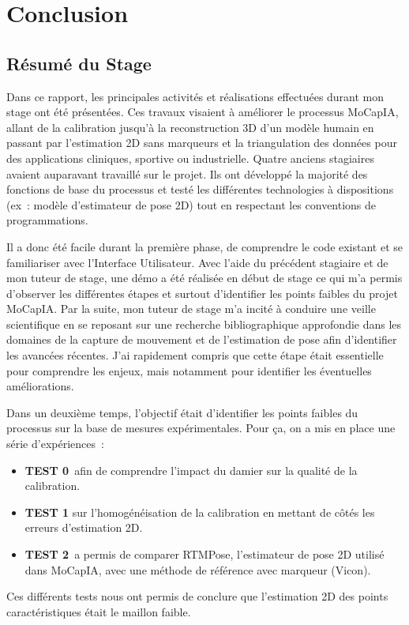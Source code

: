 \chapter{Conclusion}

\section{Résumé du Stage}
    
    Dans ce rapport, les principales activités et réalisations effectuées durant mon stage ont été présentées. Ces travaux visaient à améliorer le processus MoCapIA, allant de la calibration jusqu'à la reconstruction 3D d'un modèle humain en passant par l'estimation 2D sans marqueurs et la triangulation des données pour des applications cliniques, sportive ou industrielle. Quatre anciens stagiaires avaient auparavant travaillé sur le projet. Ils ont développé la majorité des fonctions de base du processus et testé les différentes technologies à dispositions (ex : modèle d'estimateur de pose 2D) tout en respectant les conventions de programmations.
    
    Il a donc été facile durant la première phase, de comprendre le code existant et se familiariser avec l'Interface Utilisateur. Avec l'aide du précédent stagiaire et de mon tuteur de stage, une démo a été réalisée en début de stage ce qui m'a permis d'observer les différentes étapes et surtout d'identifier les points faibles du projet MoCapIA. Par la suite, mon tuteur de stage m'a incité à conduire une veille scientifique en se reposant sur une recherche bibliographique approfondie dans les domaines de la capture de mouvement et de l'estimation de pose afin d'identifier les avancées récentes. J'ai rapidement compris que cette étape était essentielle pour comprendre les enjeux, mais notamment pour identifier les éventuelles améliorations.
    
    Dans un deuxième temps, l'objectif était d'identifier les points faibles du processus sur la base de mesures expérimentales. Pour ça, on a mis en place une série d'expériences :
    \begin{itemize}
        \item \textbf{TEST 0} afin de comprendre l'impact du damier sur la qualité de la calibration.
        \item \textbf{TEST 1} sur l'homogénéisation de la calibration en mettant de côtés les erreurs d'estimation 2D.
        \item \textbf{TEST 2} a permis de comparer RTMPose, l'estimateur de pose 2D utilisé dans MoCapIA, avec une méthode de référence avec marqueur (Vicon).
    \end{itemize}
    Ces différents tests nous ont permis de conclure que l'estimation 2D des points caractéristiques était le maillon faible. 
    
